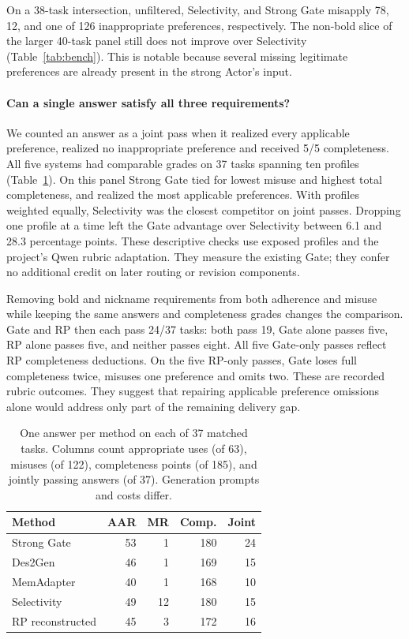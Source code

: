 \documentclass[11pt]{article}
\begin{document}
On a 38-task intersection, unfiltered, Selectivity, and Strong Gate misapply 78, 12, and one of 126 inappropriate preferences, respectively. The non-bold slice of the larger 40-task panel still does not improve over Selectivity (Table~\ref{tab:bench}). This is notable because several missing legitimate preferences are already present in the strong Actor's input.

\paragraph{Can a single answer satisfy all three requirements?}
We counted an answer as a joint pass when it realized every applicable preference, realized no inappropriate preference and received 5/5 completeness. All five systems had comparable grades on 37 tasks spanning ten profiles (Table~\ref{tab:benchjoint}). On this panel Strong Gate tied for lowest misuse and highest total completeness, and realized the most applicable preferences. With profiles weighted equally, Selectivity was the closest competitor on joint passes. Dropping one profile at a time left the Gate advantage over Selectivity between 6.1 and 28.3 percentage points. These descriptive checks use exposed profiles and the project's Qwen rubric adaptation. They measure the existing Gate; they confer no additional credit on later routing or revision components.

Removing bold and nickname requirements from both adherence and misuse while keeping the same answers and completeness grades changes the comparison. Gate and RP then each pass 24/37 tasks: both pass 19, Gate alone passes five, RP alone passes five, and neither passes eight. All five Gate-only passes reflect RP completeness deductions. On the five RP-only passes, Gate loses full completeness twice, misuses one preference and omits two. These are recorded rubric outcomes. They suggest that repairing applicable preference omissions alone would address only part of the remaining delivery gap.

\begin{table}[t]
\centering\small
\begin{tabular}{@{}lrrrr@{}}
\toprule
Method & AAR & MR & Comp. & Joint\\
\midrule
Strong Gate & 53 & 1 & 180 & 24\\
Des2Gen & 46 & 1 & 169 & 15\\
MemAdapter & 40 & 1 & 168 & 10\\
Selectivity & 49 & 12 & 180 & 15\\
RP reconstructed & 45 & 3 & 172 & 16\\
\bottomrule
\end{tabular}
\caption{One answer per method on each of 37 matched tasks. Columns count appropriate uses (of 63), misuses (of 122), completeness points (of 185), and jointly passing answers (of 37). Generation prompts and costs differ.}
\label{tab:benchjoint}
\end{table}
\end{document}
